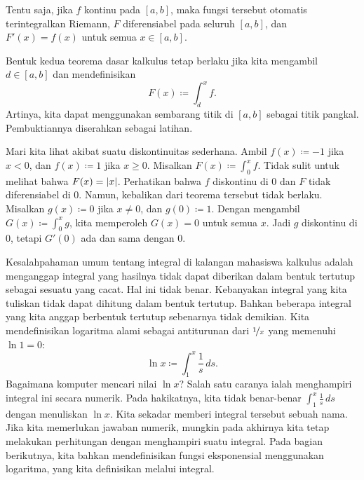 Tentu saja, jika $f$ kontinu pada $[a,b]$, maka fungsi tersebut otomatis terintegralkan
Riemann, $F$ diferensiabel pada seluruh $[a,b]$, dan $F'(x) = f(x)$ untuk
semua $x \in [a,b]$.

\begin{remark} \label{remark:fundthmbase}
Bentuk kedua teorema dasar kalkulus tetap berlaku jika
kita mengambil $d \in [a,b]$ dan mendefinisikan
\begin{equation*}
F(x) \coloneqq \int_d^x f .
\end{equation*}
Artinya, kita dapat menggunakan sembarang titik di $[a,b]$ sebagai titik pangkal.  Pembuktiannya
diserahkan sebagai latihan.
\end{remark}

Mari kita lihat akibat suatu diskontinuitas sederhana.  Ambil $f(x) \coloneqq -1$ jika $x
< 0$, dan $f(x) \coloneqq 1$ jika $x \geq 0$.  Misalkan $F(x) \coloneqq \int_0^x f$.  Tidak
sulit untuk melihat bahwa $F(x) = \lvert {x} \rvert$.  Perhatikan bahwa $f$ diskontinu di
$0$ dan $F$ tidak diferensiabel di $0$.  Namun, kebalikan dari
teorema tersebut tidak
berlaku.
Misalkan $g(x) \coloneqq 0$ jika $x \neq 0$, dan $g(0) \coloneqq 1$.
Dengan mengambil $G(x) \coloneqq \int_0^x g$,
kita memperoleh $G(x) = 0$ untuk semua $x$.  Jadi $g$ diskontinu
di $0$, tetapi $G'(0)$ ada dan sama dengan 0.

Kesalahpahaman umum tentang integral di kalangan mahasiswa kalkulus adalah
menganggap integral yang hasilnya tidak dapat diberikan dalam bentuk tertutup sebagai sesuatu yang
cacat.  Hal ini tidak benar.  Kebanyakan integral yang kita tuliskan tidak dapat
dihitung dalam bentuk tertutup.  Bahkan beberapa integral yang kita anggap
berbentuk tertutup sebenarnya tidak demikian.  Kita mendefinisikan
logaritma alami sebagai antiturunan dari $\nicefrac{1}{x}$
yang memenuhi $\ln 1 = 0$:
\begin{equation*}
\ln x \coloneqq \int_1^x \frac{1}{s}\,ds .
\end{equation*}
Bagaimana komputer mencari nilai $\ln x$?
Salah satu caranya ialah menghampiri integral ini secara numerik.
Pada hakikatnya,
kita tidak benar-benar  $\int_1^x \frac{1}{s}\,ds$ dengan
menuliskan $\ln x$.  Kita sekadar memberi integral tersebut sebuah nama.
Jika kita memerlukan jawaban numerik,
mungkin pada akhirnya kita tetap melakukan
perhitungan dengan menghampiri suatu integral.
Pada bagian berikutnya, kita bahkan mendefinisikan fungsi eksponensial menggunakan
logaritma, yang kita definisikan melalui integral.

